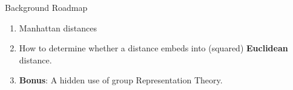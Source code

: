 \begin{frame}{Background Roadmap}
  \begin{enumerate} 
  \item Manhattan distances
  \item {\color{blue}How to determine whether a distance embeds into (squared)
    \textbf{Euclidean} distance.}
  \item \textbf{Bonus}: A hidden use of group Representation Theory.
  \end{enumerate}
\end{frame}

